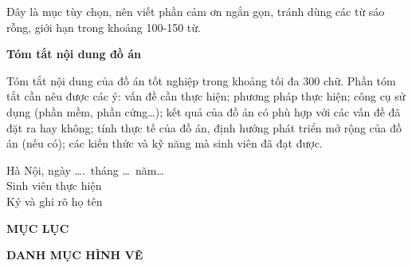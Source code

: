 \documentclass[12pt,a4paper]{report}
\begin{document}
\vspace{0.8cm}

Đây là mục tùy chọn, nên viết phần cảm ơn ngắn gọn, tránh dùng các từ sáo rỗng, giới hạn trong khoảng 100-150 từ.


\vspace{1.5cm}

\begin{center}
    {\fontsize{13}{16}\selectfont\bfseries Tóm tắt nội dung đồ án}
\end{center}

\vspace{0.8cm}

Tóm tắt nội dung của đồ án tốt nghiệp trong khoảng tối đa 300 chữ. Phần tóm tắt cần nêu được các ý: vấn đề cần thực hiện; phương pháp thực hiện; công cụ sử dụng (phần mềm, phần cứng\dots); kết quả của đồ án có phù hợp với các vấn đề đã đặt ra hay không; tính thực tế của đồ án, định hướng phát triển mở rộng của đồ án (nếu có); các kiến thức và kỹ năng mà sinh viên đã đạt được.


\vspace{3cm}

\begin{flushright}
    \begin{minipage}{0.35\textwidth}
        \centering
        Hà Nội, ngày \dots.\ tháng \dots\ năm\dots\\[12pt]
        {\fontsize{13}{16}\selectfont Sinh viên thực hiện}\\[20pt]
        {\fontsize{10}{12}\selectfont Ký và ghi rõ họ tên}
    \end{minipage}
\end{flushright}

\newpage

\begin{center}
    {\fontsize{13}{16}\selectfont\bfseries MỤC LỤC}
\end{center}

\vspace{0.8cm}


\newpage

\begin{center}
    {\fontsize{13}{16}\selectfont\bfseries DANH MỤC HÌNH VẼ}
\end{center}
\end{document}
